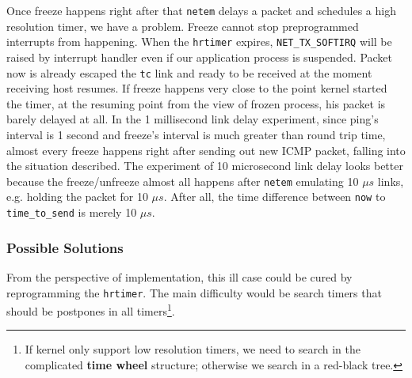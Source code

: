 \documentclass{acm_proc_article-sp}
\begin{document}
Once freeze happens right after that \texttt{netem} delays a packet and schedules a high resolution timer, we have a problem.
Freeze cannot stop preprogrammed interrupts from happening.
When the \texttt{hrtimer} expires, \texttt{NET\_TX\_SOFTIRQ} will be raised by interrupt handler even if our application process is suspended.
Packet now is already escaped the \texttt{tc} link and ready to be received at the moment receiving host resumes.%
If freeze happens very close to the point kernel started the timer, at the resuming point from the view of frozen process, his packet is barely delayed at all.
In the 1 millisecond link delay experiment, since ping's interval is 1 second and freeze's interval is much greater than round trip time,
almost every freeze happens right after sending out new ICMP packet, falling into the situation described.
The experiment of 10 microsecond link delay looks better because the freeze/unfreeze almost all happens after \texttt{netem} emulating 10 $\mu s$ links, e.g. holding the packet for 10 $\mu s$.
After all, the time difference between \texttt{now} to \texttt{time\_to\_send} is merely 10 $\mu s$.

\subsubsection{Possible Solutions}
From the perspective of implementation, this ill case could be cured by reprogramming the \texttt{hrtimer}.
The main difficulty would be search timers that should be postpones in all timers\footnote{If kernel only support low resolution timers, we need to search in the complicated \textbf{time wheel} structure; otherwise we search in a red-black tree.}.
\end{document}
